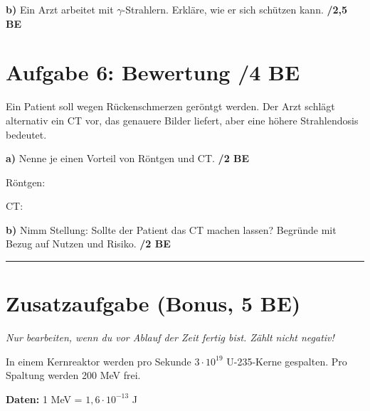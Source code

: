 \documentclass[11pt,a4paper]{article}
\newcommand{\punkte}[1]{\hfill\textbf{/#1 BE}}
\newcommand{\antwortfeld}[1]{\vspace{#1}\hrulefill\par\vspace{0.2cm}\hrulefill\par\vspace{0.2cm}\hrulefill\par}
\begin{document}
\vspace{0.5cm}

\textbf{b)} Ein Arzt arbeitet mit $\gamma$-Strahlern. Erkläre, wie er sich schützen kann. \punkte{2,5}

\antwortfeld{1cm}

\vspace{0.5cm}

\section*{Aufgabe 6: Bewertung \punkte{4}}

Ein Patient soll wegen Rückenschmerzen geröntgt werden. Der Arzt schlägt alternativ ein CT vor, das genauere Bilder liefert, aber eine höhere Strahlendosis bedeutet.

\vspace{0.3cm}

\textbf{a)} Nenne je einen Vorteil von Röntgen und CT. \punkte{2}

Röntgen: \hrulefill

\vspace{0.3cm}

CT: \hrulefill

\vspace{0.5cm}

\textbf{b)} Nimm Stellung: Sollte der Patient das CT machen lassen? Begründe mit Bezug auf Nutzen und Risiko. \punkte{2}

\antwortfeld{1.5cm}

\vspace{1cm}

\hrule
\vspace{0.3cm}

\section*{Zusatzaufgabe (Bonus, 5 BE)}

\textit{Nur bearbeiten, wenn du vor Ablauf der Zeit fertig bist. Zählt nicht negativ!}

\vspace{0.3cm}

In einem Kernreaktor werden pro Sekunde $3 \cdot 10^{19}$ U-235-Kerne gespalten.
Pro Spaltung werden 200 MeV frei.

\textbf{Daten:} 1 MeV = $1{,}6 \cdot 10^{-13}$ J

\vspace{0.3cm}
\end{document}
